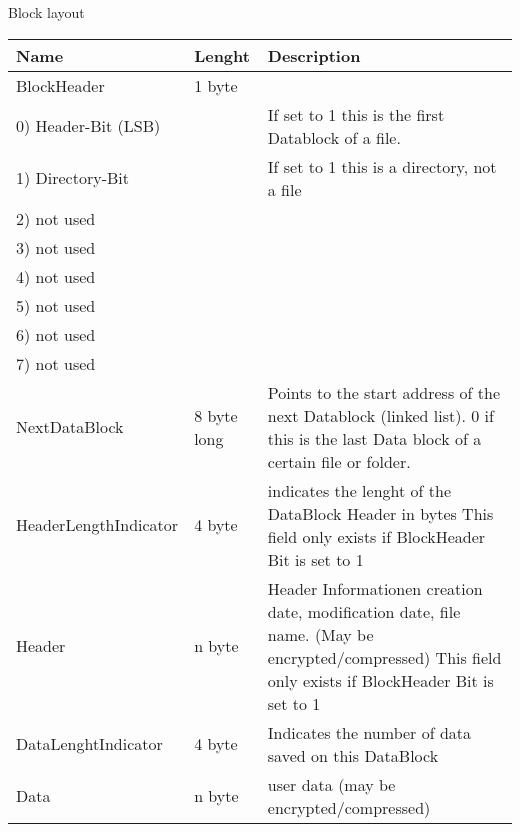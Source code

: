 Block layout \\

\begin{tabular}{|l|l|p{5cm}|}
\hline
  \textbf{Name} & \textbf{Lenght} & \textbf{Description}
\\  \hline
 BlockHeader & 1 byte &
 \\
 \hspace{0.2cm} 0) Header-Bit (LSB) & &  If set to 1 this is the first Datablock of a file.
 \\ 
 \hspace{0.2cm} 1) Directory-Bit & &  If set to 1 this is a directory, not a file
 \\ 
 \hspace{0.2cm} 2) not used & &  
 \\ 
 \hspace{0.2cm} 3) not used & &  
 \\ 
 \hspace{0.2cm} 4) not used & &  
 \\ 
 \hspace{0.2cm} 5) not used & &  
 \\ 
 \hspace{0.2cm} 6) not used & &  
 \\ 
 \hspace{0.2cm} 7) not used & &  
 
\\  \hline
 NextDataBlock & 8 byte long & 
 Points to the start address of the next Datablock (linked list).
    0 if this is the last Data block of a certain file or folder.
\\  \hline
  HeaderLengthIndicator & 4 byte &     indicates the lenght of the DataBlock Header in bytes
  \newline This field only exists if BlockHeader Bit is set to 1
\\  \hline
  Header & 
  n byte &
  Header Informationen creation date, modification date, file name. (May be encrypted/compressed)
  \newline This field only exists if BlockHeader Bit is set to 1
\\  \hline
  DataLenghtIndicator & 4 byte &
    Indicates the number of data saved on this DataBlock
\\  \hline
 Data & n byte & user data (may be encrypted/compressed)
\\  \hline
\end{tabular}